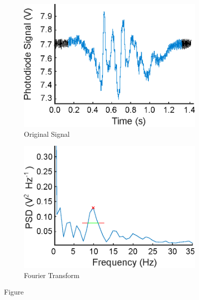 \documentclass{physics_article_B}
\begin{document}
         \begin{figure}[H]
            \centering   
            \begin{subfigure}[b]{0.48\textwidth}
                \hspace*{0cm}\includegraphics[width=\textwidth]{Figures/PingSignal.eps}
                \caption{Original Signal}
                \label{fig:oscillation:signal}
            \end{subfigure}\hspace{3pt}
            \begin{subfigure}[b]{0.48\textwidth}
                \hspace*{0.1cm}\includegraphics[width=\textwidth]{Figures/PingPD.eps} 
                \caption{Fourier Transform}
                \label{fig:oscillation:FT}
                \end{subfigure}
            \caption{Figure }\label{fig:oscillation}
        \end{figure} 
        
\end{document}
